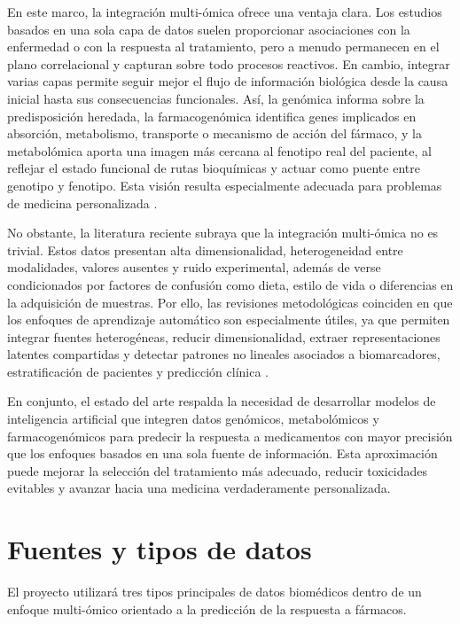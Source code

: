 \documentclass[11pt]{article}
\begin{document}
En este marco, la integración multi-ómica ofrece una ventaja clara. Los estudios basados en una sola capa de datos suelen proporcionar asociaciones con la enfermedad o con la respuesta al tratamiento, pero a menudo permanecen en el plano correlacional y capturan sobre todo procesos reactivos. En cambio, integrar varias capas permite seguir mejor el flujo de información biológica desde la causa inicial hasta sus consecuencias funcionales. Así, la genómica informa sobre la predisposición heredada, la farmacogenómica identifica genes implicados en absorción, metabolismo, transporte o mecanismo de acción del fármaco, y la metabolómica aporta una imagen más cercana al fenotipo real del paciente, al reflejar el estado funcional de rutas bioquímicas y actuar como puente entre genotipo y fenotipo. Esta visión resulta especialmente adecuada para problemas de medicina personalizada \cite{multiomics_review}.

No obstante, la literatura reciente subraya que la integración multi-ómica no es trivial. Estos datos presentan alta dimensionalidad, heterogeneidad entre modalidades, valores ausentes y ruido experimental, además de verse condicionados por factores de confusión como dieta, estilo de vida o diferencias en la adquisición de muestras. Por ello, las revisiones metodológicas coinciden en que los enfoques de aprendizaje automático son especialmente útiles, ya que permiten integrar fuentes heterogéneas, reducir dimensionalidad, extraer representaciones latentes compartidas y detectar patrones no lineales asociados a biomarcadores, estratificación de pacientes y predicción clínica \cite{ml_multiomics,ai_pharmacogenomics,multiomics_integration}.

En conjunto, el estado del arte respalda la necesidad de desarrollar modelos de inteligencia artificial que integren datos genómicos, metabolómicos y farmacogenómicos para predecir la respuesta a medicamentos con mayor precisión que los enfoques basados en una sola fuente de información. Esta aproximación puede mejorar la selección del tratamiento más adecuado, reducir toxicidades evitables y avanzar hacia una medicina verdaderamente personalizada.

\section{Fuentes y tipos de datos}

El proyecto utilizará tres tipos principales de datos biomédicos dentro de un enfoque multi-ómico orientado a la predicción de la respuesta a fármacos.
\end{document}
